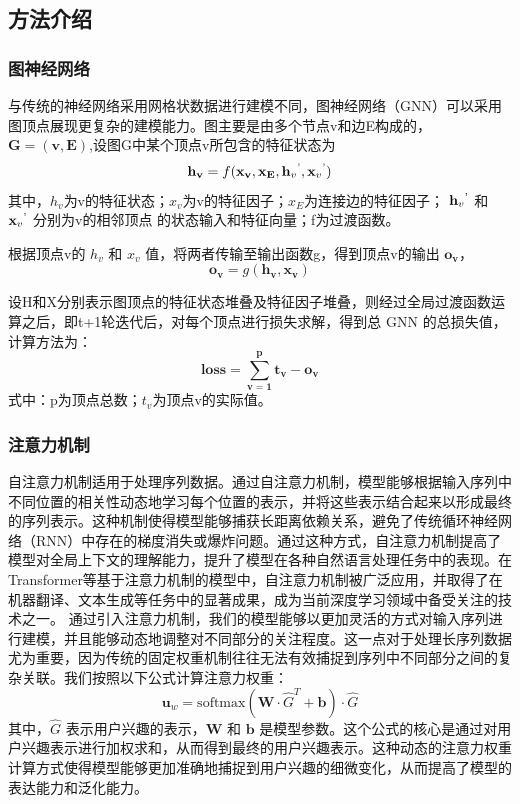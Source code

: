 \documentclass[withoutpreface,bwprint]{cumcmthesis} %
\begin{document}
	\subsection{方法介绍}
	\subsubsection{ 图神经网络}
	与传统的神经网络采用网格状数据进行建模不同，图神经网络（GNN）可以采用图顶点展现更复杂的建模能力。图主要是由多个节点v和边E构成的，$\mathbf{G=(v,E)}$,设图G中某个顶点v所包含的特征状态为
	\begin{equation}
		\mathbf{h_v} = f(\mathbf{x_v},\mathbf{x_E},\mathbf{h}_v\textsuperscript{'},\mathbf{x}_v\textsuperscript{'})
	\end{equation}
	其中，$h_v$为v的特征状态；$x_v$为v的特征因子；$x_E$为连接边的特征因子； $\mathbf{h}_v\textsuperscript{'}$ 和 $\mathbf{x}_v\textsuperscript{'}$ 分别为v的相邻顶点
	的状态输入和特征向量；f为过渡函数。
	
	根据顶点v的 $h_v$ 和 $x_v$ 值，将两者传输至输出函数g，得到顶点v的输出 $\mathbf{o_{v}}$，
	\begin{equation}
		\mathbf{o_v} = g(\mathbf{h_v,x_v})
	\end{equation}
	
	设H和X分别表示图顶点的特征状态堆叠及特征因子堆叠，则经过全局过渡函数运算之后，即t+1轮迭代后，对每个顶点进行损失求解，得到总 GNN 的总损失值，计算方法为：
	\begin{equation}
		\mathbf{loss} = \mathbf{\sum_{v=1}^{p} t_v - o_v }
	\end{equation}
	式中：p为顶点总数；$t_v$为顶点v的实际值。
	\subsubsection{ 注意力机制}
	自注意力机制适用于处理序列数据。通过自注意力机制，模型能够根据输入序列中不同位置的相关性动态地学习每个位置的表示，并将这些表示结合起来以形成最终的序列表示。这种机制使得模型能够捕获长距离依赖关系，避免了传统循环神经网络（RNN）中存在的梯度消失或爆炸问题。通过这种方式，自注意力机制提高了模型对全局上下文的理解能力，提升了模型在各种自然语言处理任务中的表现。在Transformer等基于注意力机制的模型中，自注意力机制被广泛应用，并取得了在机器翻译、文本生成等任务中的显著成果，成为当前深度学习领域中备受关注的技术之一。
	通过引入注意力机制，我们的模型能够以更加灵活的方式对输入序列进行建模，并且能够动态地调整对不同部分的关注程度。这一点对于处理长序列数据尤为重要，因为传统的固定权重机制往往无法有效捕捉到序列中不同部分之间的复杂关联。我们按照以下公式计算注意力权重：
	\begin{equation}
		\mathbf{u}_w = \text{softmax}(\mathbf{W} \cdot \hat{G}^T + \mathbf{b}) \cdot \hat{G} 
	\end{equation}
	其中，$\hat{G}$ 表示用户兴趣的表示，$\mathbf{W}$ 和 $\mathbf{b}$ 是模型参数。这个公式的核心是通过对用户兴趣表示进行加权求和，从而得到最终的用户兴趣表示。这种动态的注意力权重计算方式使得模型能够更加准确地捕捉到用户兴趣的细微变化，从而提高了模型的表达能力和泛化能力。
\end{document}
